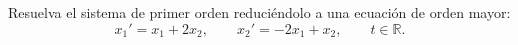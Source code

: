 Resuelva el sistema de primer orden reduciéndolo a una ecuación de orden mayor:
\[x_1'=x_1+2x_2,\qquad x_2'=-2x_1+x_2,\qquad t\in\mathbb R.\]
